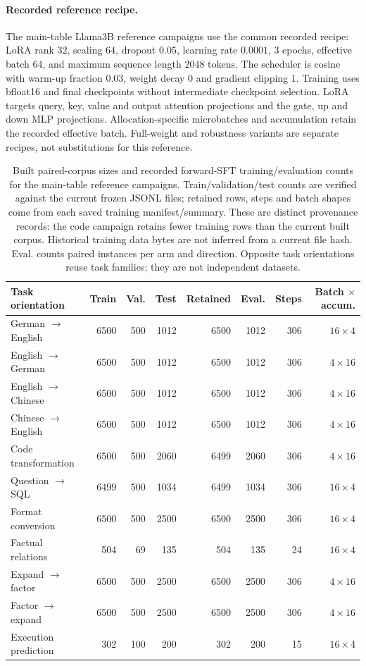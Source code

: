 \paragraph{Recorded reference recipe.}
The main-table Llama3B reference campaigns use the common recorded recipe: LoRA rank $32$, scaling $64$, dropout $0.05$, learning rate $0.0001$, $3$ epochs, effective batch $64$, and maximum sequence length $2048$ tokens. The scheduler is cosine with warm-up fraction $0.03$, weight decay $0$ and gradient clipping $1$. Training uses bfloat16 and final checkpoints without intermediate checkpoint selection. LoRA targets query, key, value and output attention projections and the gate, up and down MLP projections. Allocation-specific microbatches and accumulation retain the recorded effective batch. Full-weight and robustness variants are separate recipes, not substitutions for this reference.
\begin{table}[t]
\centering\footnotesize
\setlength{\tabcolsep}{4pt}
\begin{tabular}{lrrrrrrr}
\toprule
Task orientation & Train & Val. & Test & Retained & Eval. & Steps & Batch $\times$ accum. \\
\midrule
German $\to$ English & 6500 & 500 & 1012 & 6500 & 1012 & 306 & $16\times4$ \\
English $\to$ German & 6500 & 500 & 1012 & 6500 & 1012 & 306 & $4\times16$ \\
English $\to$ Chinese & 6500 & 500 & 1012 & 6500 & 1012 & 306 & $4\times16$ \\
Chinese $\to$ English & 6500 & 500 & 1012 & 6500 & 1012 & 306 & $4\times16$ \\
Code transformation & 6500 & 500 & 2060 & 6499 & 2060 & 306 & $4\times16$ \\
Question $\to$ SQL & 6499 & 500 & 1034 & 6499 & 1034 & 306 & $16\times4$ \\
Format conversion & 6500 & 500 & 2500 & 6500 & 2500 & 306 & $16\times4$ \\
Factual relations & 504 & 69 & 135 & 504 & 135 & 24 & $16\times4$ \\
Expand $\to$ factor & 6500 & 500 & 2500 & 6500 & 2500 & 306 & $4\times16$ \\
Factor $\to$ expand & 6500 & 500 & 2500 & 6500 & 2500 & 306 & $4\times16$ \\
Execution prediction & 302 & 100 & 200 & 302 & 200 & 15 & $16\times4$ \\
\bottomrule
\end{tabular}
\caption{Built paired-corpus sizes and recorded forward-SFT training/evaluation counts for the main-table reference campaigns. Train/validation/test counts are verified against the current frozen JSONL files; retained rows, steps and batch shapes come from each saved training manifest/summary. These are distinct provenance records: the code campaign retains fewer training rows than the current built corpus. Historical training data bytes are not inferred from a current file hash. Eval. counts paired instances per arm and direction. Opposite task orientations reuse task families; they are not independent datasets.}
\label{tab:reference-methods}
\end{table}
